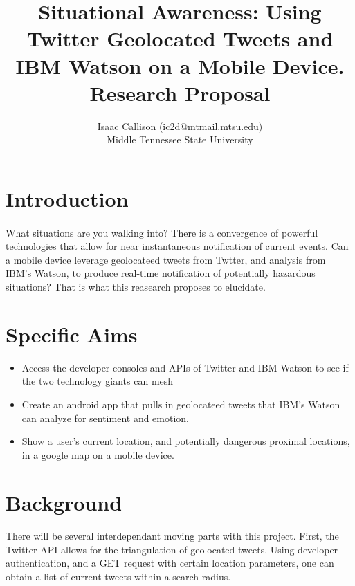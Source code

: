 \documentclass[12pt, oneside]{article}
\title{Situational Awareness: Using Twitter Geolocated Tweets and IBM Watson on a Mobile Device.
\\\medskip Research Proposal}
\author{Isaac Callison (ic2d@mtmail.mtsu.edu)\\Middle Tennessee State University}
\begin{document}
\maketitle
\nocite{*}

\section{Introduction}
\paragraph{}
What situations are you walking into? There is a convergence of powerful
technologies that allow for near instantaneous notification of current events.
Can a mobile device leverage geolocateed tweets from Twtter, and analysis from
IBM's Watson, to produce real-time notification of potentially hazardous
situations? That is what this reasearch proposes to elucidate.

\section{Specific Aims}
\begin{itemize}
 \item Access the developer consoles and APIs of Twitter and IBM Watson to see
 if the two technology giants can mesh

 \item Create an android app that pulls in geolocateed tweets that IBM's Watson
 can analyze for sentiment and emotion.

 \item Show a user's current location, and potentially dangerous proximal
 locations, in a google map on a mobile device.

\end{itemize}

\section{Background}
\paragraph{}
There will be several interdependant moving parts with this project. First, the
Twitter API allows for the triangulation of geolocated tweets\cite{TwitterGeo}.
Using developer authentication, and a GET request with certain location parameters, one can obtain a list of current tweets within a search radius.
\end{document}
